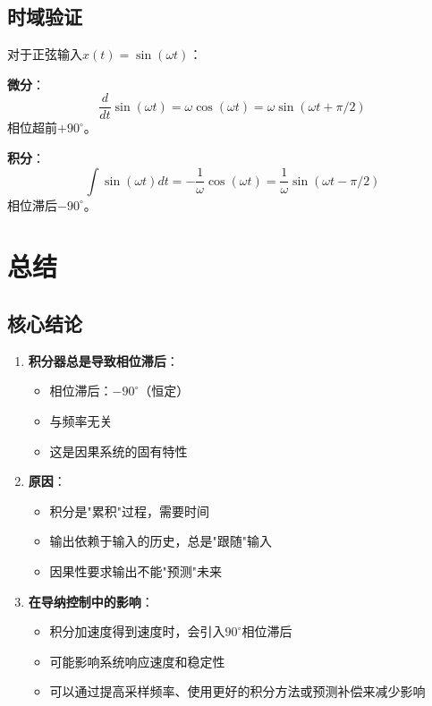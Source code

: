 \documentclass[12pt,a4paper]{article}
\begin{document}
\begin{enumerate}
\subsection{时域验证}

对于正弦输入$x(t) = \sin(\omega t)$：

\textbf{微分}：
\begin{equation}
\frac{d}{dt}\sin(\omega t) = \omega \cos(\omega t) = \omega \sin(\omega t + \pi/2)
\end{equation}
相位超前$+90^\circ$。

\textbf{积分}：
\begin{equation}
\int \sin(\omega t) dt = -\frac{1}{\omega}\cos(\omega t) = \frac{1}{\omega}\sin(\omega t - \pi/2)
\end{equation}
相位滞后$-90^\circ$。

\section{总结}

\subsection{核心结论}

\begin{enumerate}
\item \textbf{积分器总是导致相位滞后}：
\begin{itemize}
\item 相位滞后：$-90^\circ$（恒定）
\item 与频率无关
\item 这是因果系统的固有特性
\end{itemize}

\item \textbf{原因}：
\begin{itemize}
\item 积分是"累积"过程，需要时间
\item 输出依赖于输入的历史，总是"跟随"输入
\item 因果性要求输出不能"预测"未来
\end{itemize}

\item \textbf{在导纳控制中的影响}：
\begin{itemize}
\item 积分加速度得到速度时，会引入$90^\circ$相位滞后
\item 可能影响系统响应速度和稳定性
\item 可以通过提高采样频率、使用更好的积分方法或预测补偿来减少影响
\end{itemize}
\end{enumerate}


\end{enumerate}
\end{document}
